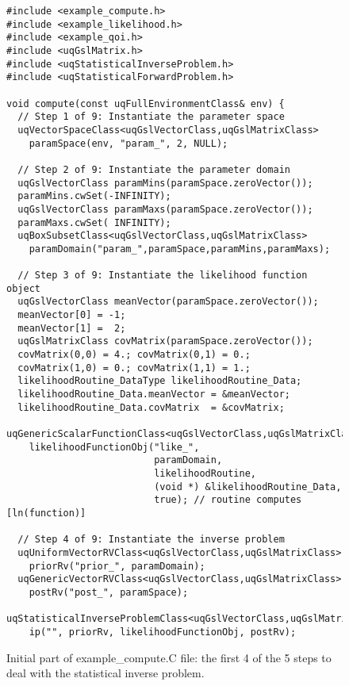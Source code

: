 \begin{figure}[h!]
\begin{center}
\begin{verbatim}
#include <example_compute.h>
#include <example_likelihood.h>
#include <example_qoi.h>
#include <uqGslMatrix.h>
#include <uqStatisticalInverseProblem.h>
#include <uqStatisticalForwardProblem.h>

void compute(const uqFullEnvironmentClass& env) {
  // Step 1 of 9: Instantiate the parameter space
  uqVectorSpaceClass<uqGslVectorClass,uqGslMatrixClass>
    paramSpace(env, "param_", 2, NULL);

  // Step 2 of 9: Instantiate the parameter domain
  uqGslVectorClass paramMins(paramSpace.zeroVector());
  paramMins.cwSet(-INFINITY);
  uqGslVectorClass paramMaxs(paramSpace.zeroVector());
  paramMaxs.cwSet( INFINITY);
  uqBoxSubsetClass<uqGslVectorClass,uqGslMatrixClass>
    paramDomain("param_",paramSpace,paramMins,paramMaxs);

  // Step 3 of 9: Instantiate the likelihood function object
  uqGslVectorClass meanVector(paramSpace.zeroVector());
  meanVector[0] = -1;
  meanVector[1] =  2;
  uqGslMatrixClass covMatrix(paramSpace.zeroVector());
  covMatrix(0,0) = 4.; covMatrix(0,1) = 0.;
  covMatrix(1,0) = 0.; covMatrix(1,1) = 1.;
  likelihoodRoutine_DataType likelihoodRoutine_Data;
  likelihoodRoutine_Data.meanVector = &meanVector;
  likelihoodRoutine_Data.covMatrix  = &covMatrix;
  uqGenericScalarFunctionClass<uqGslVectorClass,uqGslMatrixClass>
    likelihoodFunctionObj("like_",
                          paramDomain,
                          likelihoodRoutine,
                          (void *) &likelihoodRoutine_Data,
                          true); // routine computes [ln(function)]

  // Step 4 of 9: Instantiate the inverse problem
  uqUniformVectorRVClass<uqGslVectorClass,uqGslMatrixClass>
    priorRv("prior_", paramDomain);
  uqGenericVectorRVClass<uqGslVectorClass,uqGslMatrixClass>
    postRv("post_", paramSpace);
  uqStatisticalInverseProblemClass<uqGslVectorClass,uqGslMatrixClass>
    ip("", priorRv, likelihoodFunctionObj, postRv);
\end{verbatim}
\end{center}
\caption{
Initial part of example\_compute.C file: the first 4 of the 5 steps to deal with the statistical inverse problem.
}
\label{fig-compute-c1}
\end{figure}

